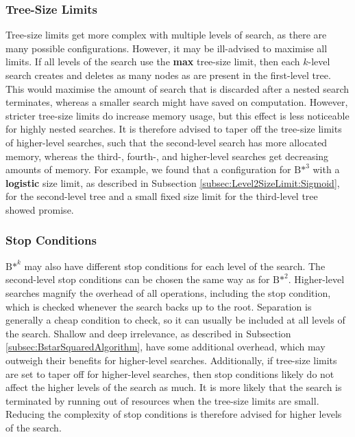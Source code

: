 \subsubsection{Tree-Size Limits}
Tree-size limits get more complex with multiple levels of search, as there are many possible configurations. However, it may be ill-advised to maximise all limits. If all levels of the search use the \textbf{max} tree-size limit, then each $k$-level search creates and deletes as many nodes as are present in the first-level tree.
This would maximise the amount of search that is discarded after a nested search terminates, whereas a smaller search might have saved on computation. However, stricter tree-size limits do increase memory usage, but this effect is less noticeable for highly nested searches. It is therefore advised to taper off the tree-size limits of higher-level searches, such that the second-level search has more allocated memory, whereas the third-, fourth-, and higher-level searches get decreasing amounts of memory. For example, we found that a configuration for ${\text{B*}}^3$ with a \textbf{logistic} size limit, as described in Subsection \ref{subsec:Level2SizeLimit:Sigmoid}, for the second-level tree and a small fixed size limit for the third-level tree showed promise.

\subsubsection{Stop Conditions}
${\text{B*}}^k$ may also have different stop conditions for each level of the search. The second-level stop conditions can be chosen the same way as for ${\text{B*}}^2$. Higher-level searches magnify the overhead of all operations, including the stop condition, which is checked whenever the search backs up to the root. Separation is generally a cheap condition to check, so it can usually be included at all levels of the search. Shallow and deep irrelevance, as described in Subsection \ref{subsec:BstarSquaredAlgorithm}, have some additional overhead, which may outweigh their benefits for higher-level searches. Additionally, if tree-size limits are set to taper off for higher-level searches, then stop conditions likely do not affect the higher levels of the search as much. It is more likely that the search is terminated by running out of resources when the tree-size limits are small. Reducing the complexity of stop conditions is therefore advised for higher levels of the search.

